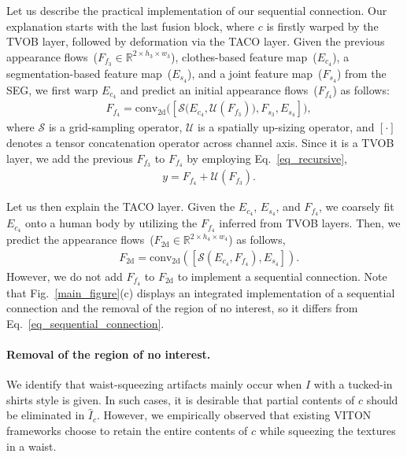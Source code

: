 \documentclass[letterpaper]{article} %
\begin{document}
Let us describe the practical implementation of our sequential connection.
Our explanation starts with the last fusion block, where $c$ is firstly warped by the TVOB layer, followed by deformation via the TACO layer.
Given the previous appearance flows~($F_{f_{3}} \in \mathbb{R}^{2\times h_{3} \times w_{3}}$), clothes-based feature map~($E_{{c}_{4}}$), a segmentation-based feature map~($E_{{s}_{4}}$), and a joint feature map~($F_{{s}_{4}}$) from the SEG, we first warp $E_{{c}_{4}}$ and predict an initial appearance flows~($F_{f_{4}}$) as follows:
\begin{eqnarray}
    & F_{f_{4}} = \text{conv}_{\text{2d}}\big( [\mathcal{S}\big(E_{{c}_{4}}, \mathcal{U}(F_{f_{3}})\big), F_{{s}_{3}}, E_{{s}_{4}}] \big),
\end{eqnarray}
where $\mathcal{S}$ is a grid-sampling operator, $\mathcal{U}$ is a spatially up-sizing operator, and $[\cdot]$ denotes a tensor concatenation operator across channel axis.
Since it is a TVOB layer, we add the previous $F_{f_{3}}$ to $F_{f_{4}}$ by employing Eq.~\ref{eq_recursive},
\begin{eqnarray}
    & y = F_{f_{4}} + \mathcal{U}(F_{f_{3}}). \nonumber
    \label{eq_initial_warping}
\end{eqnarray}

Let us then explain the TACO layer.
Given the $E_{{c}_{4}}$, $E_{{s}_{4}}$, and $F_{f_{4}}$, we coarsely fit $E_{{c}_{4}}$ onto a human body by utilizing the $F_{f_{4}}$ inferred from TVOB layers. Then, we predict the appearance flows~($F_{\text{2d}} \in \mathbb{R}^{2 \times h_4 \times w_4}$) as follows,
\begin{eqnarray}
    & F_{\text{2d}} = \text{conv}_{\text{2d}}([\mathcal{S}(E_{{c}_{4}}, F_{f_{4}}), E_{{s}_{4}}]).
    \label{eq_sequential_connection}
\end{eqnarray}
However, we do not add $F_{f_{4}}$ to $F_{\text{2d}}$ to implement a sequential connection.
Note that Fig.~\ref{main_figure}(c) displays an integrated implementation of a sequential connection and the removal of the region of no interest, so it differs from Eq.~\ref{eq_sequential_connection}.

\paragraph{Removal of the region of no interest.}
We identify that waist-squeezing artifacts mainly occur when $I$ with a tucked-in shirts style is given.
In such cases, it is desirable that partial contents of $c$ should be eliminated in $\hat{I}_c$.
However, we empirically observed that existing VITON frameworks choose to retain the entire contents of $c$ while squeezing the textures in a waist.
\end{document}
